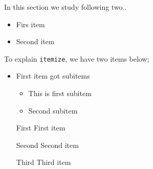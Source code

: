 \documentclass[11pt]{article}
\begin{document}
In this section we study following two..
\begin{itemize}
\item Firs item
\item Second item
\end{itemize}

To explain \texttt{itemize}, we have two items below;
\begin{itemize}
\item First item got subitems
  \begin{itemize}
    \item This is first subitem
    \item Second subitem
  \end{itemize}
\end{itemize}

\begin{itemize}
\item[First] First item
\item[Second] Second item
\item[Third] Third item
\end{itemize}
\end{document}
